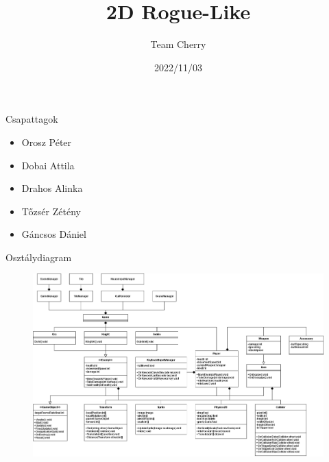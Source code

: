 \documentclass[14pt, aspectratio=169]{beamer}
\title{2D Rogue-Like}
\author{Team Cherry}
\date{2022/11/03}
\begin{document}
	\maketitle
	\begin{frame}{Csapattagok}
		\begin{itemize}
			\item Orosz Péter
			\item Dobai Attila
			\item Drahos Alinka
			\item Tőzsér Zétény
			\item Gáncsos Dániel
		\end{itemize}
	\end{frame}

	\begin{frame}{Osztálydiagram}
		\begin{figure}
			\centering
    		\includegraphics[height = 0.8\textheight]{osztalydiagram.png}
		\end{figure}
	\end{frame}
	
\end{document}

